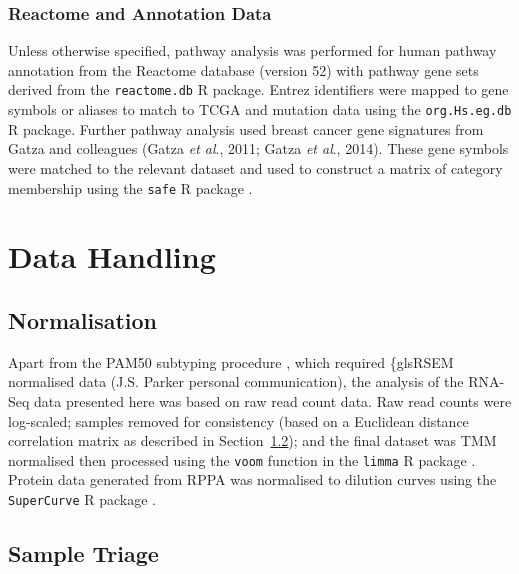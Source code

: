 \subsubsection{Reactome and Annotation Data} \label{methods:gene_set}

Unless otherwise specified, \gls{pathway} analysis was performed for human \gls{pathway} annotation from the Reactome database (version 52) with \gls{pathway} gene sets derived from the \texttt{reactome.db} R package. Entrez identifiers were mapped to gene symbols or aliases to match to \gls{TCGA}  and \gls{mutation} data using the \texttt{org.Hs.eg.db} R package. Further \gls{pathway} analysis used breast cancer gene signatures from Gatza and colleagues (Gatza \textit{et al}., 2011; Gatza \textit{et al}., 2014). These gene symbols were matched to the relevant dataset and used to construct a matrix of category membership using the \texttt{safe} R package \citep{safe}.

\section{Data Handling}

\subsection{Normalisation}

Apart from the \gls{PAM50} subtyping procedure \citep{Parker2009}, which required \{gls{RSEM} normalised data (J.S. Parker personal communication), the analysis of the \acrshort{RNA}-Seq data presented here was based on raw read count data. Raw read counts were log-scaled; samples removed for consistency (based on a Euclidean distance correlation matrix as described in Section~\ref{methods:sample_qc}); and the final dataset was TMM normalised \citep{Robinson2010} then processed using the \texttt{voom} function \citep{Law2014} in the \texttt{limma} R package \citep{limma}. Protein  data generated from RPPA was normalised to dilution curves using the \texttt{SuperCurve} R package \citep{Neeley2009, Ju2015}.


\FloatBarrier

\subsection{Sample Triage} \label{methods:sample_qc}

